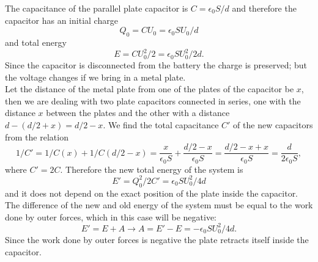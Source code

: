 \documentclass[11pt]{article}
\begin{document}
\solueng
The capacitance of the parallel plate capacitor is $C = \epsilon_0 S / d$ and therefore the capacitor has an initial charge
$$Q_0 = C U_0 = \epsilon_0 S U_0/ d$$ 
and total energy 
$$E = C U_0^2 / 2 = \epsilon_0 S U_0^2/ 2 d.$$ 
Since the capacitor is disconnected from the battery the charge is preserved; but the voltage changes if we bring in a metal plate.\\
Let the distance of the metal plate from one of the plates of the capacitor be $x$, then we are dealing with two plate capacitors connected in series, one with the distance $x$ between the plates and the other with a distance $d - (d/2 + x) = d/2 - x$. We find the total capacitance $C'$ of the new capacitors from the relation
$$1/C' = 1/C(x) + 1/C(d/2-x) = \frac{x}{\epsilon_0 S} + \frac{d/2 - x}{\epsilon_0 S} = \frac{d/2 - x + x}{\epsilon_0 S} = \frac{d}{2 \epsilon_0 S},$$ 
where $C' = 2C$. Therefore the new total energy of the system is
$$E' = Q_0^2 / 2C' = \epsilon_0 S U_0^2/ 4 d$$
and it does not depend on the exact position of the plate inside the capacitor. The difference of the new and old energy of the system must be equal to the work done by outer forces, which in this case will be negative:
$$E' = E + A \rightarrow A = E' - E = - \epsilon_0 S U_0^2/ 4 d.$$ 
Since the work done by outer forces is negative the plate retracts itself inside the capacitor.
\probend
\bigskip

\end{document}

